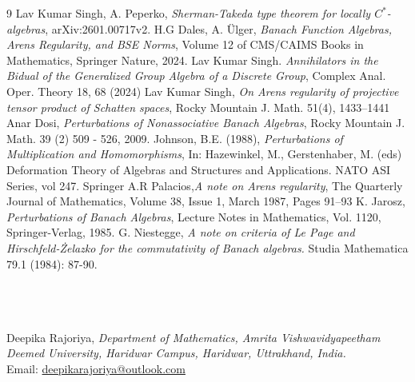\documentclass[pdflatex,sn-mathphys-num]{sn-jnl}%
\theoremstyle{thmstyleone}%
\theoremstyle{thmstyletwo}%
\theoremstyle{thmstylethree}%
\begin{document}
\begin{thebibliography}{9}
	 Lav Kumar Singh, A. Peperko, \textit{Sherman-Takeda type theorem for locally $C^*$-algebras},  arXiv:2601.00717v2.
 H.G Dales, A. \"Ulger, \textit{Banach Function Algebras, Arens Regularity, and BSE Norms}, Volume 12 of CMS/CAIMS Books in Mathematics, Springer Nature, 2024.
Lav Kumar Singh. \textit{Annihilators in the Bidual of the Generalized Group Algebra of a Discrete Group}, Complex Anal. Oper. Theory 18, 68 (2024)
Lav Kumar Singh, \textit{On Arens regularity of projective tensor product of Schatten spaces}, Rocky Mountain J. Math. 51(4), 1433–1441 
Anar Dosi, \textit{Perturbations of Nonassociative Banach Algebras}, Rocky Mountain J. Math. 39 (2) 509 - 526, 2009.
Johnson, B.E. (1988), \textit{ Perturbations of Multiplication and Homomorphisms}, In: Hazewinkel, M., Gerstenhaber, M. (eds) Deformation Theory of Algebras and Structures and Applications. NATO ASI Series, vol 247. Springer
A.R Palacios,\textit{A note on Arens regularity}, The Quarterly Journal of Mathematics, Volume 38, Issue 1, March 1987, Pages 91–93
K. Jarosz,
\textit{Perturbations of Banach Algebras},
Lecture Notes in Mathematics, Vol. 1120,
Springer-Verlag, 1985.
G. Niestegge, \textit{A note on criteria of Le Page and Hirschfeld-Żelazko for the commutativity of Banach algebras.} Studia Mathematica 79.1 (1984): 87-90.

\end{thebibliography}
~\\~\\~\\
 Deepika Rajoriya, \textit{Department of Mathematics, Amrita Vishwavidyapeetham Deemed University, Haridwar Campus, Haridwar, Uttrakhand, India.}\\
Email: \url{deepikarajoriya@outlook.com}
\end{document}
